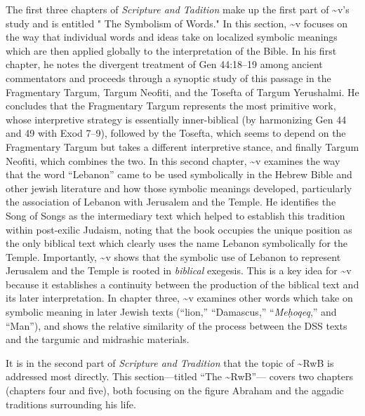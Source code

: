 The first three chapters of \emph{Scripture and Tadition} make up the
first part of \textasciitilde{}v's study and is entitled " The Symbolism
of Words." In this section, \textasciitilde{}v focuses on the way that
individual words and ideas take on localized symbolic meanings which are
then applied globally to the interpretation of the Bible. In his first
chapter, he notes the divergent treatment of Gen 44:18--19 among ancient
commentators and proceeds through a synoptic study of this passage in
the Fragmentary Targum, Targum Neofiti, and the Tosefta of Targum
Yerushalmi. He concludes that the Fragmentary Targum represents the most
primitive work, whose interpretive strategy is essentially
inner-biblical (by harmonizing Gen 44 and 49 with Exod 7--9), followed
by the Tosefta, which seems to depend on the Fragmentary Targum but
takes a different interpretive stance, and finally Targum Neofiti, which
combines the two. In this second chapter, \textasciitilde{}v examines
the way that the word ``Lebanon'' came to be used symbolically in the
Hebrew Bible and other jewish literature and how those symbolic meanings
developed, particularly the association of Lebanon with Jerusalem and
the Temple. He identifies the Song of Songs as the intermediary text
which helped to establish this tradition within post-exilic Judaism,
noting that the book occupies the unique position as the only biblical
text which clearly uses the name Lebanon symbolically for the Temple.
Importantly, \textasciitilde{}v shows that the symbolic use of Lebanon
to represent Jerusalem and the Temple is rooted in \emph{biblical}
exegesis. This is a key idea for \textasciitilde{}v because it
establishes a continuity between the production of the biblical text and
its later interpretation. In chapter three, \textasciitilde{}v examines
other words which take on symbolic meaning in later Jewish texts
(``lion,'' ``Damascus,'' ``\emph{Meḥoqeq},'' and ``Man''), and shows the
relative similarity of the process between the DSS texts and the
targumic and midrashic materials.

It is in the second part of \emph{Scripture and Tradition} that the
topic of \textasciitilde{}RwB is addressed most directly. This
section---titled ``The \textasciitilde{}RwB''--- covers two chapters
(chapters four and five), both focusing on the figure Abraham and the
aggadic traditions surrounding his life.

